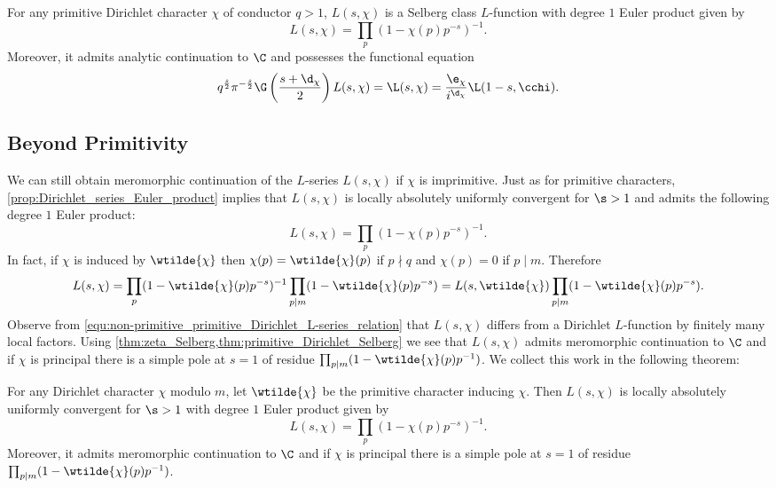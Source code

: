       \begin{theorem}\label{thm:primitive_Dirichlet_Selberg}
        For any primitive Dirichlet character \(\chi\) of conductor \(q > 1\), \(L(s,\chi)\) is a Selberg class \(L\)-function with degree \(1\) Euler product given by
        \[
          L(s,\chi) = \prod_{p}(1-\chi(p)p^{-s})^{-1}.
        \]
        Moreover, it admits analytic continuation to \(\C\) and possesses the functional equation
        \[
          q^{\frac{s}{2}}\pi^{-\frac{s}{2}}\G\left(\frac{s+\d_{\chi}}{2}\right)L(s,\chi) = \L(s,\chi) = \frac{\e_{\chi}}{i^{\d_{\chi}}}\L(1-s,\cchi).
        \]
      \end{theorem}
    \subsection*{Beyond Primitivity}
      We can still obtain meromorphic continuation of the \(L\)-series \(L(s,\chi)\) if \(\chi\) is imprimitive. Just as for primitive characters, \cref{prop:Dirichlet_series_Euler_product} implies that \(L(s,\chi)\) is locally absolutely uniformly convergent for \(\s > 1\) and admits the following degree \(1\) Euler product:
      \[
        L(s,\chi) = \prod_{p}(1-\chi(p)p^{-s})^{-1}.
      \]
      In fact, if \(\chi\) is induced by \(\wtilde{\chi}\) then \(\chi(p) = \wtilde{\chi}(p)\) if \(p \nmid q\) and \(\chi(p) = 0\) if \(p \mid m\). Therefore
      \begin{equation}\label{equ:non-primitive_primitive_Dirichlet_L-series_relation}
        L(s,\chi) = \prod_{p}(1-\wtilde{\chi}(p)p^{-s})^{-1}\prod_{p \mid m}(1-\wtilde{\chi}(p)p^{-s}) = L(s,\wtilde{\chi})\prod_{p \mid m}(1-\wtilde{\chi}(p)p^{-s}).
      \end{equation}
      Observe from \cref{equ:non-primitive_primitive_Dirichlet_L-series_relation} that \(L(s,\chi)\) differs from a Dirichlet \(L\)-function by finitely many local factors. Using \cref{thm:zeta_Selberg,thm:primitive_Dirichlet_Selberg} we see that \(L(s,\chi)\) admits meromorphic continuation to \(\C\) and if \(\chi\) is principal there is a simple pole at \(s = 1\) of residue \(\prod_{p \mid m}(1-\wtilde{\chi}(p)p^{-1})\). We collect this work in the following theorem:

      \begin{theorem}\label{thm:analytic_continuation_Dirichlet}
        For any Dirichlet character \(\chi\) modulo \(m\), let \(\wtilde{\chi}\) be the primitive character inducing \(\chi\). Then \(L(s,\chi)\) is locally absolutely uniformly convergent for \(\s > 1\) with degree \(1\) Euler product given by
        \[
          L(s,\chi) = \prod_{p}(1-\chi(p)p^{-s})^{-1}.
        \]
        Moreover, it admits meromorphic continuation to \(\C\) and if \(\chi\) is principal there is a simple pole at \(s = 1\) of residue \(\prod_{p \mid m}(1-\wtilde{\chi}(p)p^{-1})\).
      \end{theorem}
      
